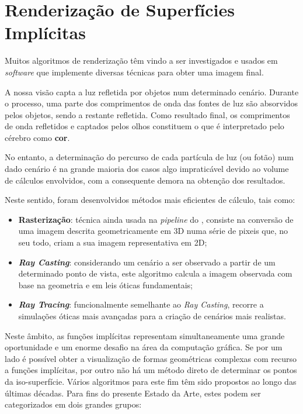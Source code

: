 

\section{Renderização de Superfícies Implícitas}
\label{sec::arte:render}

Muitos algoritmos de renderização têm vindo a ser investigados e usados em \textit{software} que implemente diversas técnicas para obter uma imagem final.

A nossa visão capta a luz refletida por objetos num determinado cenário. Durante o processo, uma parte dos comprimentos de onda das fontes de luz são absorvidos pelos objetos, sendo a restante refletida. Como resultado final, os comprimentos de onda refletidos e captados pelos olhos constituem o que é interpretado pelo cérebro como \textbf{cor}.

No entanto, a determinação do percurso de cada partícula de luz (ou fotão) num dado cenário é na grande maioria dos casos algo impraticável devido ao volume de cálculos envolvidos, com a consequente demora na obtenção dos resultados.

Neste sentido, foram desenvolvidos métodos mais eficientes de cálculo, tais como:

\begin{itemize}
    \item \textbf{Rasterização}: técnica ainda usada na \textit{pipeline} do \opengl, consiste na conversão de uma imagem descrita geometricamente em 3D numa série de pixeis que, no seu todo, criam a sua imagem representativa em 2D;
    
    \item \textbf{\itshape Ray Casting}: considerando um cenário a ser observado a partir de um determinado ponto de vista, este algoritmo calcula a imagem observada com base na geometria e em leis óticas fundamentais;
    
    \item \textbf{\itshape Ray Tracing}: funcionalmente semelhante ao \textit{Ray Casting}, recorre a simulações óticas mais avançadas para a criação de cenários mais realistas.
\end{itemize}


Neste âmbito, as funções implícitas representam simultaneamente uma grande oportunidade e um enorme desafio na área da computação gráfica. Se por um lado é possível obter a visualização de formas geométricas complexas com recurso a funções implícitas, por outro não há um método direto de determinar os pontos da iso-superfície. Vários algoritmos para este fim têm sido propostos ao longo das últimas décadas. Para fins do presente Estado da Arte, estes podem ser categorizados em dois grandes grupos:

